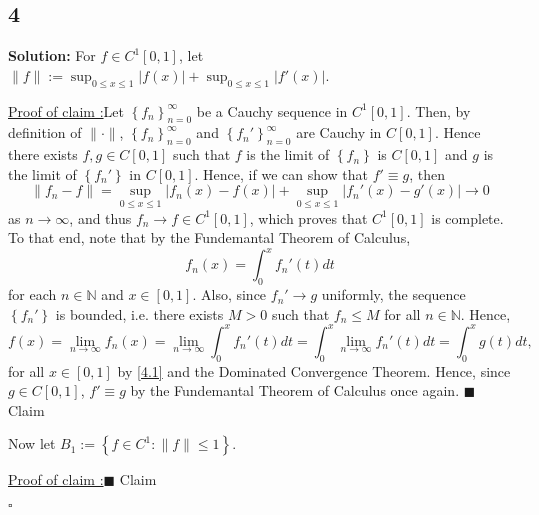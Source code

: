 \documentclass[12pt]{article}
\newcounter{ProofCounter}
\newcounter{ClaimCounter}[ProofCounter]
\newenvironment{Solution}{\stepcounter{ProofCounter}\textbf{Solution:}}{\hfill$\square$}
\newenvironment{claim}[1]{\vspace{1mm}\stepcounter{ClaimCounter}\par\noindent\underline{\bf Claim \theClaimCounter:}\space#1}{}
\newenvironment{claimproof}[1]{\par\noindent\underline{Proof of claim \theClaimCounter:}\space#1}{\hfill $\blacksquare$ Claim \theClaimCounter}
\begin{document}
\subsection*{4}
\begin{Solution}
  For $f \in C^{1}[0,1]$, let $\|f\| := \sup_{0\leq x \leq 1}|f(x)| + \sup_{0\leq x\leq 1}|f'(x)|$.

  \begin{claimproof}
    Let $\left\{ f_{n} \right\}_{n=0}^{\infty}$ be a Cauchy sequence in $C^{1}[0,1]$. Then, by definition of $\|\cdot\|$, $\left\{ f_{n}
    \right\}_{n=0}^{\infty}$ and $\left\{ f_{n}' \right\}_{n=0}^{\infty}$ are Cauchy in $C[0,1]$. Hence there exists $f, g \in C[0,1]$ such that $f$
    is the limit of $\left\{ f_n \right\}$ is $C[0,1]$ and $g$ is the limit of $\left\{ f_n' \right\}$ in $C[0,1]$. Hence, if we can show that $f'
    \equiv g$, then 
    \[
      \|f_n - f\| = \sup_{0\leq x\leq 1}|f_n(x) - f(x)| + \sup_{0\leq x \leq 1}|f_n'(x) - g'(x)| \longrightarrow 0
    \]
    as $n\rightarrow \infty$, and thus $f_n \rightarrow f \in C^{1}[0,1]$, which proves that $C^{1}[0,1]$ is complete. To that end, note that by the
    Fundemantal Theorem of Calculus,
    \begin{equation}
      f_{n}(x) = \int_{0}^{x}f_{n}'(t)dt
      \label{4.1}
    \end{equation}
    for each $n \in \mathbb{N}$ and $x \in [0,1]$. Also, since $f_{n}' \rightarrow g$ uniformly, the sequence $\left\{ f_n' \right\}$ is bounded, i.e.
    there exists $M > 0$ such that $f_{n} \leq M$ for all $n \in \mathbb{N}$. Hence,
    \[
      f(x) = \lim_{n\rightarrow\infty} f_{n}(x) = \lim_{n\rightarrow\infty}\int_{0}^{x}f_{n}'(t)dt = \int_{0}^{x} \lim_{n\rightarrow\infty}f_{n}'(t)dt
      = \int_{0}^{x}g(t)dt,
    \]
    for all $x \in [0,1]$ by \eqref{4.1} and the Dominated Convergence Theorem. Hence, since $g \in C[0,1]$, $f' \equiv g$ by the Fundemantal Theorem
    of Calculus once again.
  \end{claimproof}

  Now let $B_1 := \left\{ f \in C^{1} : \|f\| \leq 1 \right\}$.

  \begin{claimproof}
    
  \end{claimproof}

\end{Solution}
\end{document}
